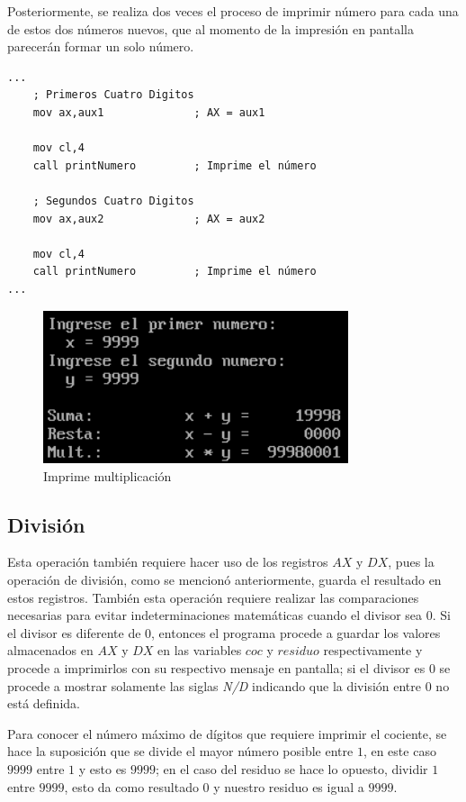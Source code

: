 \documentclass[letter,12 pt,titlepage]{article}
\begin{document}
    Posteriormente, se realiza dos veces el proceso de imprimir número para cada una de estos dos números nuevos, que al momento de la impresión en pantalla parecerán formar un solo número.

    \begin{verbatim}
...
    ; Primeros Cuatro Digitos
    mov ax,aux1              ; AX = aux1

    mov cl,4
    call printNumero         ; Imprime el número 

    ; Segundos Cuatro Digitos
    mov ax,aux2              ; AX = aux2

    mov cl,4
    call printNumero         ; Imprime el número 
...
    \end{verbatim}

    \begin{figure}[H]
    \centering
    \includegraphics[width=0.8\textwidth]{img/05.png}
    \caption{Imprime multiplicación}
    \end{figure}

    \subsection{División}

    Esta operación también requiere hacer uso de los registros $AX$ y $DX$, pues la operación de división, como se mencionó anteriormente, guarda el resultado en estos registros. También esta operación requiere realizar las comparaciones necesarias para evitar indeterminaciones matemáticas cuando el divisor sea $0$. Si el divisor es diferente de $0$, entonces el programa procede a guardar los valores almacenados en $AX$ y $DX$ en las variables $coc$ y $residuo$ respectivamente y procede a imprimirlos con su respectivo mensaje en pantalla; si el divisor es $0$ se procede a mostrar solamente las siglas \textit{N/D} indicando que la división entre $0$ no está definida.

    Para conocer el número máximo de dígitos que requiere imprimir el cociente, se hace la suposición que se divide el mayor número posible entre $1$, en este caso $9999$ entre $1$ y esto es $9999$; en el caso del residuo se hace lo opuesto, dividir $1$ entre $9999$, esto da como resultado $0$ y nuestro residuo es igual a $9999$.
\end{document}
